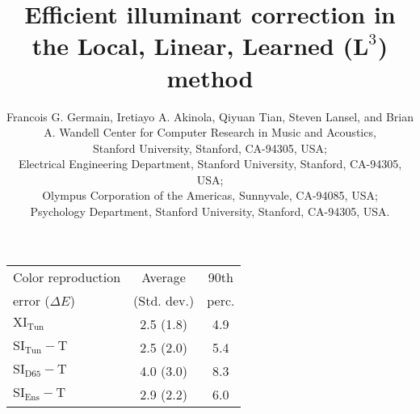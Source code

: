 \documentclass[]{spie}
\title{Efficient illuminant correction in the Local, Linear, Learned ({\LARGE$\boldsymbol L^3$}) method}
\author{Francois G. Germain\supit{a}, Iretiayo A. Akinola\supit{b}, Qiyuan Tian\supit{b}, Steven Lansel\supit{c}, and Brian A. Wandell\supit{b,d}
\skiplinehalf
\supit{a}Center for Computer Research in Music and Acoustics,\\ Stanford University, Stanford, CA-94305, USA;\\
\supit{b}Electrical Engineering Department, Stanford University, Stanford, CA-94305, USA;\\
\supit{c}Olympus Corporation of the Americas, Sunnyvale, CA-94085, USA;\\
\supit{d}Psychology Department, Stanford University, Stanford, CA-94305, USA.
}
\newcommand{\XIT}{\mathrm{XI_{Tun}}}
\newcommand{\SITT}{\mathrm{SI_{Tun}-T}}
\newcommand{\SIDT}{\mathrm{SI_{D65}-T}}
\newcommand{\SIET}{\mathrm{SI_{Ens}-T}}
\begin{document}
\maketitle

\begin {table}[b]
\begin{center}
\begin{tabular}{|l|c|c|}
\hline 
Color reproduction & Average & 90th \\ 
error ($\Delta E$) & (Std. dev.) & perc. \\ \hline 
$\XIT$ & 2.5 (1.8) & 4.9 \\ 
$\SITT$ & 2.5 (2.0) & 5.4 \\ 
$\SIDT$ & 4.0 (3.0) & 8.3 \\
$\SIET$ & 2.9 (2.2) & 6.0 \\\hline 
\end{tabular} 
\end{center}
\end{table}
\end{document}

